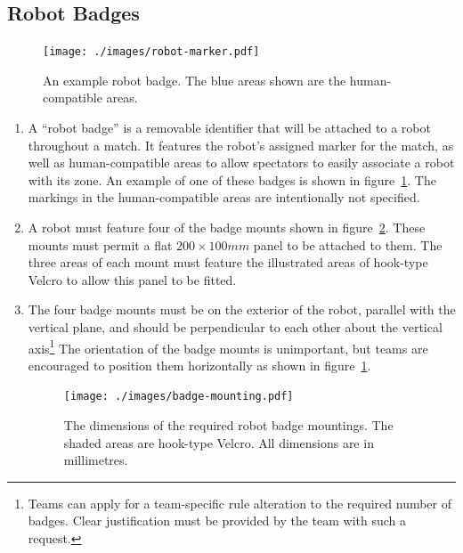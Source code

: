 \subsection{Robot Badges}
\label{sec:robot-badges}

\begin{figure}
  \centering
  \texttt{[image: ./images/robot-marker.pdf]}
  \caption{An example robot badge.
 The blue areas shown are the human-compatible areas.}
  \label{fig:example-badge}
\end{figure}

\begin{enumerate}
\item A ``robot badge'' is a removable identifier that will be attached to a robot throughout a match.
      It features the robot's assigned marker for the match, as well as human-compatible areas to allow spectators to easily associate a robot with its zone.
      An example of one of these badges is shown in figure~\ref{fig:example-badge}.
      The markings in the human-compatible areas are intentionally not specified.

\item A robot must feature four of the badge mounts shown in figure~\ref{fig:badge-mounting}.
      These mounts must permit a flat $200 \times 100mm$ panel to be attached to them.
      The three areas of each mount must feature the illustrated areas of hook-type Velcro to allow this panel to be fitted.

\item The four badge mounts must be on the exterior of the robot, parallel with the vertical plane, and should be perpendicular to each other about the vertical axis\footnote{Teams can apply for a team-specific rule alteration to the required number of badges.
      Clear justification must be provided by the team with such a request.}
      The orientation of the badge mounts is unimportant, but teams are encouraged to position them horizontally as shown in figure~\ref{fig:example-badge}.

  \begin{figure}
    \centering
    \texttt{[image: ./images/badge-mounting.pdf]}
    \caption{The dimensions of the required robot badge mountings.
 The shaded areas are hook-type Velcro.
 All dimensions are in millimetres.}
    \label{fig:badge-mounting}
  \end{figure}
\end{enumerate}

